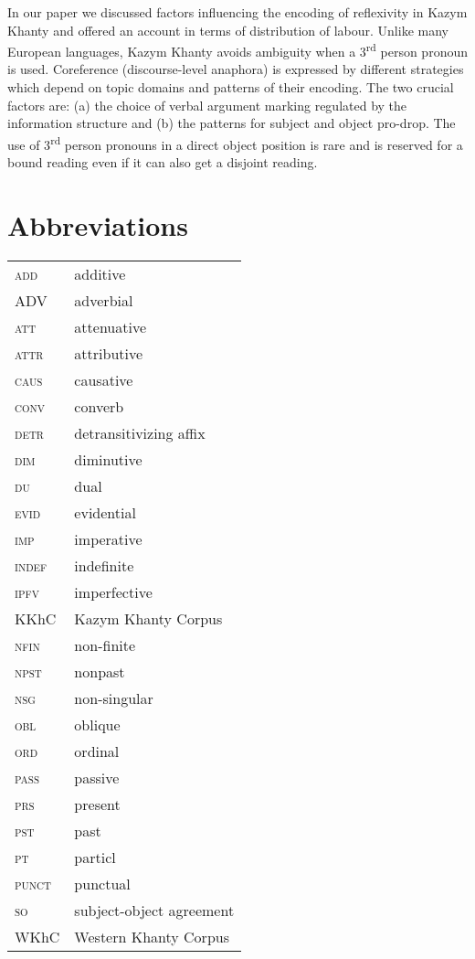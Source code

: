 \documentclass[output=paper]{langscibook}
\begin{document}
In our paper we discussed factors influencing the encoding of reflexivity in Kazym Khanty and offered an account in terms of distribution of labour. Unlike many European languages, Kazym Khanty avoids ambiguity when a 3\textsuperscript{rd} person pronoun is used. Coreference (discourse-level anaphora) is expressed by different strategies which depend on topic domains and patterns of their encoding. The two crucial factors are: (a) the choice of verbal argument marking %
regulated by the information structure and (b) the patterns for subject and object pro-drop. The use of 3\textsuperscript{rd} person pronouns in a direct object position is rare and is reserved for a bound reading even if it can also get a disjoint reading. 


\section*{Abbreviations}

\begin{tabularx}{.45\textwidth}{lQ}
\textsc{add} & additive\\ 
\textsc{ADV}	& adverbial\\ 
\textsc{att} & attenuative\\ 
\textsc{attr} & attributive\\ 
\textsc{caus} & causative\\ 
\textsc{conv} &	converb\\ 
\textsc{detr} &	detransitivizing affix\\ 
\textsc{dim} &	diminutive\\ 
\textsc{du} &	dual\\ 
\textsc{evid} &	evidential\\ 
\textsc{imp} &	imperative\\ 
\textsc{indef} &	indefinite\\ 
\textsc{ipfv} &	imperfective\\ 
KKhC  &	Kazym Khanty Corpus\\ 
\textsc{nfin} & 	non-finite\\ 
\textsc{npst} & 	nonpast\\ 
\textsc{nsg} & 	non-singular\\ 
\textsc{obl} & 	oblique\\ 
\textsc{ord} &  	ordinal\\ 
\textsc{pass} & 	passive\\ 
\textsc{prs} & 	present\\ 
\textsc{pst} & 	past\\ 
\textsc{pt} &  	particl\\ 
\textsc{punct} & 	punctual\\ 
\textsc{so} & 	subject-object agreement\\ 
WKhC &	Western Khanty Corpus\\ 
\end{tabularx}


\sloppy\printbibliography[heading=subbibliography,notkeyword=this]
\end{document}

